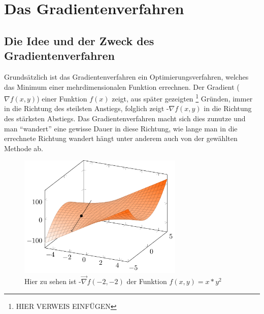 \documentclass[naustrian]{article}
\begin{document}
{\section{Das Gradientenverfahren}

\subsection{Die Idee und der Zweck des Gradientenverfahren}

Grundsätzlich ist das Gradientenverfahren ein Optimierungsverfahren, welches
das Minimum einer mehrdimensionalen Funktion errechnen. Der Gradient
(${\nabla}f(x,y)$) einer Funktion \(f(x)\) zeigt, aus später gezeigten
\footnote{HIER VERWEIS EINFÜGEN} Gründen, immer in die Richtung des steilsten
Anstiegs, folglich zeigt -${\nabla}f(x,y)$ in die Richtung des stärksten
Abstiegs. Das Gradientenverfahren macht sich dies zunutze und man ``wandert''
eine gewisse Dauer in diese Richtung, wie \textquotedbl{}lange\textquotedbl{}
man in die errechnete Richtung \textquotedbl{}wandert\textquotedbl{} hängt
unter anderem auch von der gewählten Methode ab.

\begin{figure}[H]
    \centering
    \includegraphics[width=0.7\textwidth]{grad/figure0}
    \caption[Gradientenvektor Beispiel] {Hier zu sehen ist -$\vec{\nabla}f(-2,-2)$ der Funktion $f(x,y)=x*y^2$}
\end{figure}

}
\end{document}
